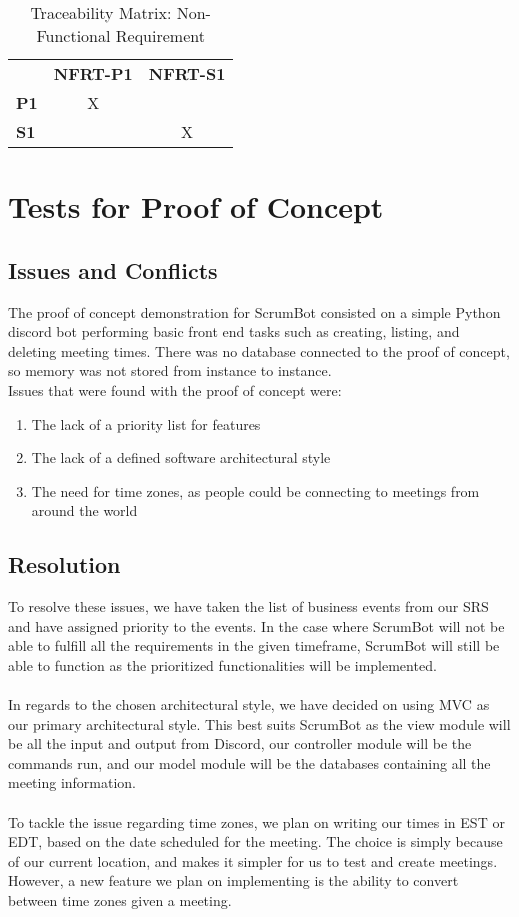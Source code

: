 \documentclass[12pt, titlepage]{article}
\begin{document}
\begin{table}[H]
    \centering
    \caption{Traceability Matrix: Non-Functional Requirement}
    \begin{tabular}{lcc}
        ~ & \textbf{NFRT-P1} & \textbf{NFRT-S1}\\
        \textbf{P1} & X & ~\\
        \textbf{S1} & ~ & X\\
    \end{tabular}
    \label{Traceability Matrix: Non-Functional Requirement}
\end{table}

\section{Tests for Proof of Concept}

\subsection{Issues and Conflicts}
The proof of concept demonstration for ScrumBot consisted on a simple Python discord bot performing basic front end tasks such as creating, listing, and deleting meeting times. There was no database connected to the proof of concept, so memory was not stored from instance to instance.\\
\noindent Issues that were found with the proof of concept were:
\begin{enumerate}
    \item The lack of a priority list for features
    \item The lack of a defined software architectural style
    \item The need for time zones, as people could be connecting to meetings from around the world
\end{enumerate}

\subsection{Resolution}
To resolve these issues, we have taken the list of business events from our SRS and have assigned priority to the events. In the case where ScrumBot will not be able to fulfill all the requirements in the given timeframe, ScrumBot will still be able to function as the prioritized functionalities will be implemented.\\ \\
\noindent In regards to the chosen architectural style, we have decided on using MVC as our primary architectural style. This best suits ScrumBot as the view module will be all the input and output from Discord, our controller module will be the commands run, and our model module will be the databases containing all the meeting information.\\ \\
\noindent To tackle the issue regarding time zones, we plan on writing our times in EST or EDT, based on the date scheduled for the meeting. The choice is simply because of our current location, and makes it simpler for us to test and create meetings. However, a new feature we plan on implementing is the ability to convert between time zones given a meeting.
	
\end{document}
